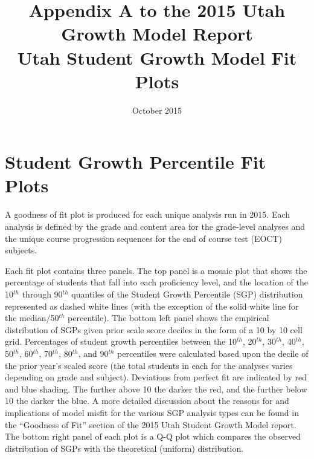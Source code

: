 \documentclass[12pt]{article}
\begin{document}
\newcommand{\pl}[1]{\textsf{PL#1}}
\newcommand{\Cov}{\ensuremath{\mbox{\textsf{Cov}}}}
\newcommand{\Diag}{\ensuremath{\mbox{\textsf{Diag}}}}
\newcommand{\Bias}{\ensuremath{\mbox{\textsf{Bias}}}}
\newcommand{\Astar}[1]{\ensuremath{#1^{^*}}}
\thispagestyle{plain}
\pagestyle{damian}

\title{\textsf{\LARGE Appendix A to the 2015 Utah Growth Model Report  \\\medskip Utah Student Growth Model Fit Plots }}
\author{}

 \date{October 2015} 

\maketitle

\newpage


\section{Student Growth Percentile Fit
Plots}\label{student-growth-percentile-fit-plots}

A goodness of fit plot is produced for each unique analysis run in 2015.
Each analysis is defined by the grade and content area for the
grade-level analyses and the unique course progression sequences for the
end of course test (EOCT) subjects.

Each fit plot contains three panels. The top panel is a mosaic plot that
shows the percentage of students that fall into each proficiency level,
and the location of the 10\(^{th}\) through 90\(^{th}\) quantiles of the
Student Growth Percentile (SGP) distribution represented as dashed white
lines (with the exception of the solid white line for the
median/50\(^{th}\) percentile). The bottom left panel shows the
empirical distribution of SGPs given prior scale score deciles in the
form of a 10 by 10 cell grid. Percentages of student growth percentiles
between the 10\(^{th}\), 20\(^{th}\), 30\(^{th}\), 40\(^{th}\),
50\(^{th}\), 60\(^{th}\), 70\(^{th}\), 80\(^{th}\), and 90\(^{th}\)
percentiles were calculated based upon the decile of the prior year's
scaled score (the total students in each for the analyses varies
depending on grade and subject). Deviations from perfect fit are
indicated by red and blue shading. The further above 10 the darker the
red, and the further below 10 the darker the blue. A more detailed
discussion about the reasons for and implications of model misfit for
the various SGP analysis types can be found in the ``Goodness of Fit''
section of the 2015 Utah Student Growth Model report. The bottom right
panel of each plot is a Q-Q plot which compares the observed
distribution of SGPs with the theoretical (uniform) distribution.
\end{document}
